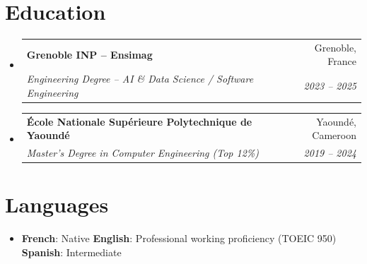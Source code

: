 \documentclass[letterpaper,10.5pt]{article}
\makeatletter
\newcommand{\resumeSubheading}[4]{
  \vspace{3pt}\item
  \begin{tabular*}{0.97\textwidth}[t]{l@{\extracolsep{\fill}}r}
    \textbf{#1} & #2 \\
    \textit{\small #3} & \textit{\small #4} \\
  \end{tabular*}\vspace{1pt}
}
\newcommand{\resumeSubHeadingListStart}{\begin{itemize}[leftmargin=0.08in, label={}]}
\newcommand{\resumeSubHeadingListEnd}{\end{itemize}}
\makeatother
\begin{document}
\section{Education}
\resumeSubHeadingListStart
  \resumeSubheading
    {Grenoble INP -- Ensimag}{Grenoble, France}
    {Engineering Degree -- AI \& Data Science / Software Engineering}{2023 -- 2025}
  \resumeSubheading
    {\'Ecole Nationale Sup\'erieure Polytechnique de Yaound\'e}{Yaound\'e, Cameroon}
    {Master's Degree in Computer Engineering (Top 12\%)}{2019 -- 2024}
\resumeSubHeadingListEnd

\section{Languages}
\begin{itemize}[leftmargin=0.08in, label={}]
  \item \textbf{French}: Native \quad \textbf{English}: Professional working proficiency (TOEIC 950) \quad \textbf{Spanish}: Intermediate
\end{itemize}
\end{document}
